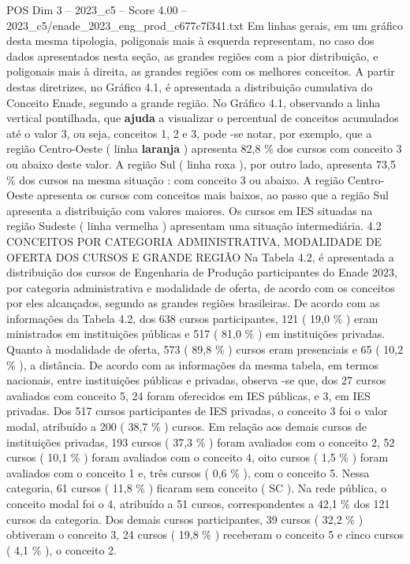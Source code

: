 \begin{textsample}{POS Dim 3 – 2023\_c5 – Score 4.00 – 2023\_c5/enade\_2023\_eng\_prod\_c677c7f341.txt}
Em linhas gerais, em um gráfico desta mesma tipologia, poligonais mais à esquerda representam, no caso dos dados apresentados nesta seção, as grandes regiões com a pior distribuição, e poligonais mais à direita, as grandes regiões com os melhores conceitos.
A partir destas diretrizes, no Gráfico 4.1, é apresentada a distribuição cumulativa do Conceito Enade, segundo a grande região.
No Gráfico 4.1, observando a linha vertical pontilhada, que \textbf{ajuda} a visualizar o percentual de conceitos acumulados até o valor 3, ou seja, conceitos 1, 2 e 3, pode -se notar, por exemplo, que a região Centro-Oeste ( linha \textbf{laranja} ) apresenta 82,8 \% dos cursos com conceito 3 ou abaixo deste valor.
A região Sul ( linha roxa ), por outro lado, apresenta 73,5 \% dos cursos na mesma situação : com conceito 3 ou abaixo.
A região Centro-Oeste apresenta os cursos com conceitos mais baixos, ao passo que a região Sul apresenta a distribuição com valores maiores.
Os cursos em IES situadas na região Sudeste ( linha vermelha ) apresentam uma situação intermediária. 4.2 CONCEITOS POR CATEGORIA ADMINISTRATIVA, MODALIDADE DE OFERTA DOS CURSOS E GRANDE REGIÃO Na Tabela 4.2, é apresentada a distribuição dos cursos de Engenharia de Produção participantes do Enade 2023, por categoria administrativa e modalidade de oferta, de acordo com os conceitos por eles alcançados, segundo as grandes regiões brasileiras.
De acordo com as informações da Tabela 4.2, dos 638 cursos participantes, 121 ( 19,0 \% ) eram ministrados em instituições públicas e 517 ( 81,0 \% ) em instituições privadas.
Quanto à modalidade de oferta, 573 ( 89,8 \% ) cursos eram presenciais e 65 ( 10,2 \% ), a distância.
De acordo com as informações da mesma tabela, em termos nacionais, entre instituições públicas e privadas, observa -se que, dos 27 cursos avaliados com conceito 5, 24 foram oferecidos em IES públicas, e 3, em IES privadas.
Dos 517 cursos participantes de IES privadas, o conceito 3 foi o valor modal, atribuído a 200 ( 38,7 \% ) cursos.
Em relação aos demais cursos de instituições privadas, 193 cursos ( 37,3 \% ) foram avaliados com o conceito 2, 52 cursos ( 10,1 \% ) foram avaliados com o conceito 4, oito cursos ( 1,5 \% ) foram avaliados com o conceito 1 e, três cursos ( 0,6 \% ), com o conceito 5.
Nessa categoria, 61 cursos ( 11,8 \% ) ficaram sem conceito ( SC ).
Na rede pública, o conceito modal foi o 4, atribuído a 51 cursos, correspondentes a 42,1 \% dos 121 cursos da categoria.
Dos demais cursos participantes, 39 cursos ( 32,2 \% ) obtiveram o conceito 3, 24 cursos ( 19,8 \% ) receberam o conceito 5 e cinco cursos ( 4,1 \% ), o conceito 2.

\end{textsample}
